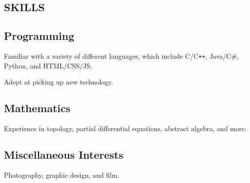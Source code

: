\documentclass[11pt]{article}
\begin{document}
\begin{multicols}{2}
  \section*{SKILLS}

  \subsection*{Programming}
  Familiar with a variety of different languages, which include C/C{}\verb!++!, Java/C\#, Python, and HTML/CSS/JS.

  Adept at picking up new technology.

  \subsection*{Mathematics}
  Experience in topology, partial differential equations, abstract algebra, and more.

  \subsection*{Miscellaneous Interests}
  Photography, graphic design, and film.

\end{multicols}
\end{document}

